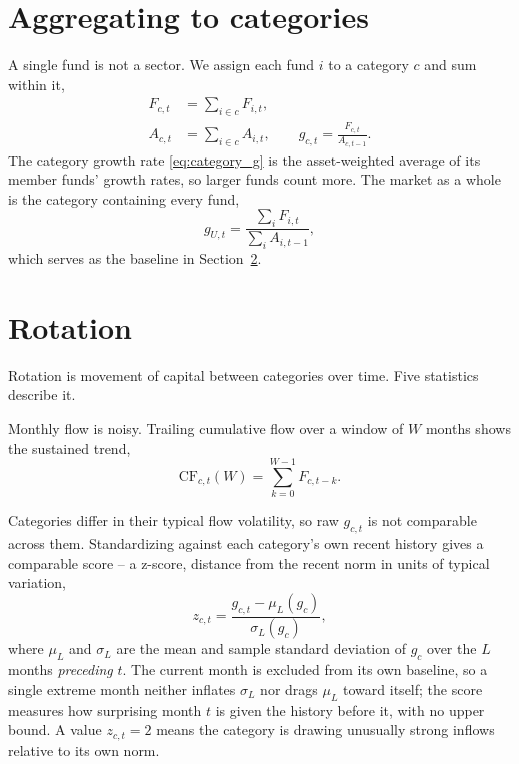 \documentclass[11pt]{article}
\begin{document}
\section{Aggregating to categories}
\label{sec:aggregation}

A single fund is not a sector. We assign each fund $i$ to a category $c$ and sum within it,
\begin{align}
F_{c,t} &= \sum_{i \in c} F_{i,t}, \label{eq:category_flow}\\
A_{c,t} &= \sum_{i \in c} A_{i,t}, \qquad
g_{c,t} = \frac{F_{c,t}}{A_{c,t-1}}. \label{eq:category_g}
\end{align}
The category growth rate \eqref{eq:category_g} is the asset-weighted average of its member
funds' growth rates, so larger funds count more. The market as a whole is the category
containing every fund,
\begin{equation}
\label{eq:universe_g}
g_{U,t} = \frac{\sum_i F_{i,t}}{\sum_i A_{i,t-1}},
\end{equation}
which serves as the baseline in Section~\ref{sec:rotation}.

\section{Rotation}
\label{sec:rotation}

Rotation is movement of capital between categories over time. Five statistics describe it.

Monthly flow is noisy. Trailing cumulative flow over a window of $W$ months shows the
sustained trend,
\begin{equation}
\label{eq:cumulative_flow}
\mathrm{CF}_{c,t}(W) = \sum_{k=0}^{W-1} F_{c,t-k}.
\end{equation}

Categories differ in their typical flow volatility, so raw $g_{c,t}$ is not comparable
across them. Standardizing against each category's own recent history gives a comparable
score -- a z-score, distance from the recent norm in units of typical variation,
\begin{equation}
\label{eq:zscore}
z_{c,t} = \frac{g_{c,t} - \mu_{L}(g_c)}{\sigma_{L}(g_c)},
\end{equation}
where $\mu_L$ and $\sigma_L$ are the mean and sample standard deviation of $g_c$ over the
$L$ months \emph{preceding} $t$. The current month is excluded from its own baseline, so a
single extreme month neither inflates $\sigma_L$ nor drags $\mu_L$ toward itself; the score
measures how surprising month $t$ is given the history before it, with no upper bound. A
value $z_{c,t}=2$ means the category is drawing unusually strong inflows relative to its
own norm.
\end{document}
